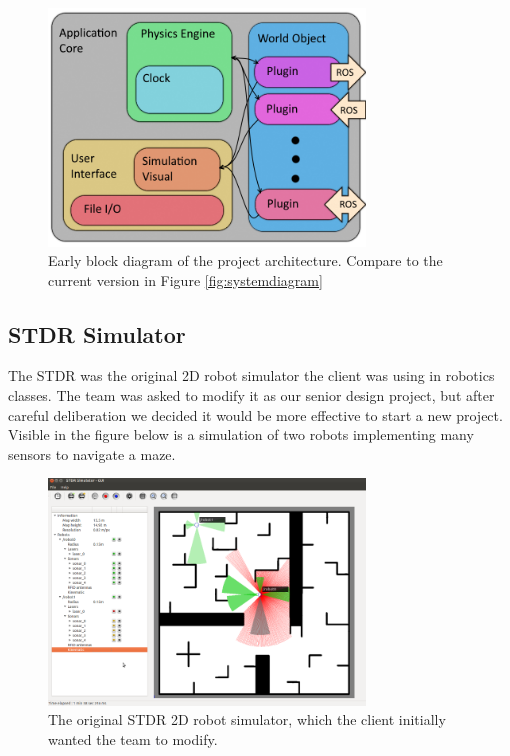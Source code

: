 \begin{figure}[h]
	\centering
	\includegraphics[width=0.75\textwidth]{./images_design/sysarch}
	\caption{Early block diagram of the project architecture. Compare to the current version in Figure \ref{fig:systemdiagram}}
	\label{fig:prototypediagram}
\end{figure}

\subsection{STDR Simulator}

The STDR was the original 2D robot simulator the client was using in robotics classes. The team was asked to modify it as our senior design project, but after careful deliberation we decided it would be more effective to start a new project. Visible in the figure below is a simulation of two robots implementing many sensors to navigate a maze.

\begin{figure}[!htb]
	\begin{center}
		\includegraphics[width=0.75\textwidth]{./Images/Sprint0_STDR}
	\end{center}
	\caption{The original STDR 2D robot simulator, which the client initially wanted the team to modify.  \label{stdr}}
\end{figure}


